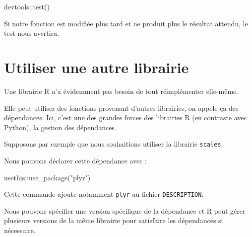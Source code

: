 \documentclass[
  letterpaper,
  DIV=11,
  numbers=noendperiod]{scrreprt}
\newenvironment{Shaded}{\begin{snugshade}}{\end{snugshade}}
\newcommand{\FunctionTok}[1]{\textcolor[rgb]{0.28,0.35,0.67}{#1}}
\newcommand{\NormalTok}[1]{\textcolor[rgb]{0.00,0.23,0.31}{#1}}
\newcommand{\SpecialCharTok}[1]{\textcolor[rgb]{0.37,0.37,0.37}{#1}}
\newcommand{\StringTok}[1]{\textcolor[rgb]{0.13,0.47,0.30}{#1}}
\begin{document}
\begin{Shaded}
\begin{Highlighting}[]
\NormalTok{devtools}\SpecialCharTok{::}\FunctionTok{test}\NormalTok{()}
\end{Highlighting}
\end{Shaded}

Si notre fonction est modifiée plus tard et ne produit plus le résultat
attendu, le test nous avertira.

\section{Utiliser une autre
librairie}\label{utiliser-une-autre-librairie}

Une librairie R n'a évidemment pas besoin de tout réimplémenter
elle-même.

Elle peut utiliser des fonctions provenant d'autres librairies, on
appele ça des dépendances. Ici, c'est une des grandes forces des
librairies R (en contraste avec Python), la gestion des dépendances.

Supposons par exemple que nous souhaitions utiliser la librairie
\texttt{scales}.

Nous pouvons déclarer cette dépendance avec :

\begin{Shaded}
\begin{Highlighting}[]
\NormalTok{usethis}\SpecialCharTok{::}\FunctionTok{use\_package}\NormalTok{(}\StringTok{"plyr"}\NormalTok{)}
\end{Highlighting}
\end{Shaded}

Cette commande ajoute notamment \texttt{plyr} au fichier
\texttt{DESCRIPTION}.

\begin{tcolorbox}[enhanced jigsaw, arc=.35mm, title=\textcolor{quarto-callout-tip-color}{\faLightbulb}\hspace{0.5em}{Le brio des dépendances R}, colback=white, left=2mm, rightrule=.15mm, toptitle=1mm, opacityback=0, bottomtitle=1mm, breakable, colframe=quarto-callout-tip-color-frame, coltitle=black, toprule=.15mm, titlerule=0mm, opacitybacktitle=0.6, bottomrule=.15mm, colbacktitle=quarto-callout-tip-color!10!white, leftrule=.75mm]

Nous pouvons spécifier une version spécifique de la dépendance et R peut
gérer plusieurs versions de la même librairie pour satisfaire les
dépendances si nécessaire.

\end{tcolorbox}
\end{document}
